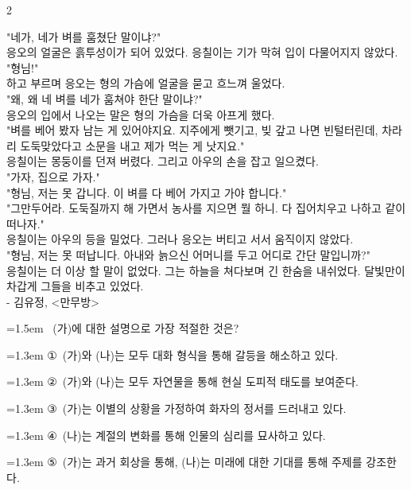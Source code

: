 \documentclass[10pt, a4paper]{article}
\begin{document}
\begin{multicols}{2}
\begin{passagebox}
"네가, 네가 벼를 훔쳤단 말이냐?" \\
응오의 얼굴은 흙투성이가 되어 있었다. 응칠이는 기가 막혀 입이 다물어지지 않았다. \\
"형님!" \\
하고 부르며 응오는 형의 가슴에 얼굴을 묻고 흐느껴 울었다. \\
"왜, 왜 네 벼를 네가 훔쳐야 한단 말이냐?" \\
응오의 입에서 나오는 말은 형의 가슴을 더욱 아프게 했다. \\
"벼를 베어 봤자 남는 게 있어야지요. 지주에게 뺏기고, 빚 갚고 나면 빈털터린데, 차라리 도둑맞았다고 소문을 내고 제가 먹는 게 낫지요." \\
응칠이는 몽둥이를 던져 버렸다. 그리고 아우의 손을 잡고 일으켰다. \\
"가자, 집으로 가자." \\
"형님, 저는 못 갑니다. 이 벼를 다 베어 가지고 가야 합니다." \\
"그만두어라. 도둑질까지 해 가면서 농사를 지으면 뭘 하니. 다 집어치우고 나하고 같이 떠나자." \\
응칠이는 아우의 등을 밀었다. 그러나 응오는 버티고 서서 움직이지 않았다. \\
"형님, 저는 못 떠납니다. 아내와 늙으신 어머니를 두고 어디로 간단 말입니까?" \\
응칠이는 더 이상 할 말이 없었다. 그는 하늘을 쳐다보며 긴 한숨을 내쉬었다. 달빛만이 차갑게 그들을 비추고 있었다.
\\[0.5em]
- 김유정, <만무방>
\end{passagebox}
\vspace{1mm}

\noindent\begin{minipage}{\columnwidth}
\vspace{2mm}
{\hangindent=1.5em  ~(가)에 대한 설명으로 가장 적절한 것은?\par}

\vspace{0.5mm}
{\hangindent=1.3em  \noindent\hspace{0.3em}①~(가)와 (나)는 모두 대화 형식을 통해 갈등을 해소하고 있다.\par}
{\hangindent=1.3em  \noindent\hspace{0.3em}②~(가)와 (나)는 모두 자연물을 통해 현실 도피적 태도를 보여준다.\par}
{\hangindent=1.3em  \noindent\hspace{0.3em}③~(가)는 이별의 상황을 가정하여 화자의 정서를 드러내고 있다.\par}
{\hangindent=1.3em  \noindent\hspace{0.3em}④~(나)는 계절의 변화를 통해 인물의 심리를 묘사하고 있다.\par}
{\hangindent=1.3em  \noindent\hspace{0.3em}⑤~(가)는 과거 회상을 통해, (나)는 미래에 대한 기대를 통해 주제를 강조한다.\par}
\vspace{4mm}
\end{minipage}
\par


\end{multicols}
\end{document}

